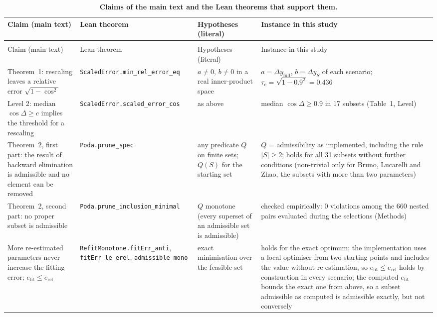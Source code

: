 \begingroup\scriptsize
\setlength{\tabcolsep}{3pt}
\begin{longtable}{@{}>{\raggedright\arraybackslash}p{3.0cm}>{\raggedright\arraybackslash}p{3.4cm}>{\raggedright\arraybackslash}p{4.2cm}>{\raggedright\arraybackslash}p{4.4cm}@{}}
\caption{\textbf{Claims of the main text and the Lean theorems that support them.}}\label{tab:claims}\\
\toprule
Claim (main text) & Lean theorem & Hypotheses (literal) & Instance in this study \\
\midrule
\endfirsthead
\multicolumn{4}{@{}l}{\emph{(continued)}}\\
\toprule
Claim (main text) & Lean theorem & Hypotheses (literal) & Instance in this study \\
\midrule
\endhead
Theorem~1: rescaling leaves a relative error $\sqrt{1-\cos^2}$ & \texttt{ScaledError.\allowbreak{}min\_\allowbreak{}rel\_\allowbreak{}error\_\allowbreak{}eq} & $a\neq0$, $b\neq0$ in a real inner-product space & $a=\Delta y_{\mathrm{full}}$, $b=\Delta y_S$ of each scenario; $\tau_e=\sqrt{1-0.9^2}=0.436$ \\
\addlinespace[3pt]
Level 2: median $\cos\Delta\ge c$ implies the threshold for a rescaling & \texttt{ScaledError.\allowbreak{}scaled\_\allowbreak{}error\_\allowbreak{}cos} & as above & median $\cos\Delta\ge0.9$ in 17 subsets (Table~1, Level) \\
\addlinespace[3pt]
Theorem~2, first part: the result of backward elimination is admissible and no element can be removed & \texttt{Poda.\allowbreak{}prune\_\allowbreak{}spec} & any predicate $Q$ on finite sets; $Q(S)$ for the starting set & $Q$ = admissibility as implemented, including the rule $|S|\ge2$; holds for all 31 subsets without further conditions (non-trivial only for Bruno, Lucarelli and Zhao, the subsets with more than two parameters) \\
\addlinespace[3pt]
Theorem~2, second part: no proper subset is admissible & \texttt{Poda.\allowbreak{}prune\_\allowbreak{}inclusion\_\allowbreak{}minimal} & $Q$ monotone (every superset of an admissible set is admissible) & checked empirically: 0 violations among the 660 nested pairs evaluated during the selections (Methods) \\
\addlinespace[3pt]
More re-estimated parameters never increase the fitting error; $e_{\mathrm{fit}}\le e_{\mathrm{rel}}$ & \texttt{RefitMonotone.\allowbreak{}fitErr\_\allowbreak{}anti}, \texttt{fitErr\_\allowbreak{}le\_\allowbreak{}erel}, \texttt{admissible\_\allowbreak{}mono} & exact minimisation over the feasible set & holds for the exact optimum; the implementation uses a local optimiser from two starting points and includes the value without re-estimation, so $e_{\mathrm{fit}}\le e_{\mathrm{rel}}$ holds by construction in every scenario; the computed $e_{\mathrm{fit}}$ bounds the exact one from above, so a subset admissible as computed is admissible exactly, but not conversely \\

\end{longtable}
